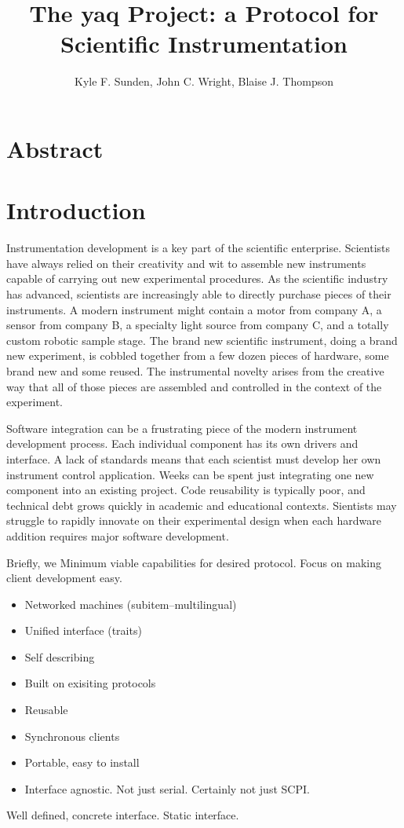 \documentclass{article}
\title{The yaq Project: a Protocol for Scientific Instrumentation}
\author{Kyle F. Sunden,
  John C. Wright,
  Blaise J. Thompson}
\begin{document}
\maketitle

\section{Abstract}

\section{Introduction}

Instrumentation development is a key part of the scientific enterprise.
Scientists have always relied on their creativity and wit to assemble new instruments capable of carrying out new experimental procedures.
As the scientific industry has advanced, scientists are increasingly able to directly purchase pieces of their instruments.
A modern instrument might contain a motor from company A, a sensor from company B, a specialty light source from company C, and a totally custom robotic sample stage.
The brand new scientific instrument, doing a brand new experiment, is cobbled together from a few dozen pieces of hardware, some brand new and some reused.
The instrumental novelty arises from the creative way that all of those pieces are assembled and controlled in the context of the experiment.

Software integration can be a frustrating piece of the modern instrument development process.
Each individual component has its own drivers and interface.
A lack of standards means that each scientist must develop her own instrument control application.
Weeks can be spent just integrating one new component into an existing project.
Code reusability is typically poor, and technical debt grows quickly in academic and educational contexts.
Sientists may struggle to rapidly innovate on their experimental design when each hardware addition requires major software development.

Briefly, we
Minimum viable capabilities for desired protocol.
Focus on making client development easy.
\begin{itemize}
  \item Networked machines (subitem--multilingual)
  \item Unified interface (traits)
  \item Self describing
  \item Built on exisiting protocols
  \item Reusable
  \item Synchronous clients
  \item Portable, easy to install
  \item Interface agnostic. Not just serial. Certainly not just SCPI.
\end{itemize}
Well defined, concrete interface.
Static interface.
\end{document}
